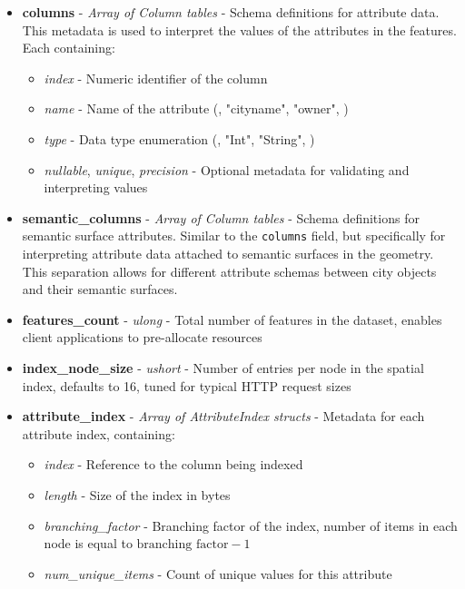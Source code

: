 \begin{itemize}
  \item \textbf{columns} - \textit{Array of Column tables} - Schema definitions for attribute data. This metadata is used to interpret the values of the attributes in the features. Each containing:
    \begin{itemize}
      \item \textit{index} - Numeric identifier of the column
      \item \textit{name} - Name of the attribute (\eg, "cityname", "owner", \etc)
      \item \textit{type} - Data type enumeration (\eg, "Int", "String", \etc)
      \item \textit{nullable}, \textit{unique}, \textit{precision} - Optional metadata for validating and interpreting values
    \end{itemize}

  \item \textbf{semantic\_columns} - \textit{Array of Column tables} - Schema definitions for semantic surface attributes. Similar to the \texttt{columns} field, but specifically for interpreting attribute data attached to semantic surfaces in the geometry. This separation allows for different attribute schemas between city objects and their semantic surfaces.

  \item \textbf{features\_count} - \textit{ulong} - Total number of features in the dataset, enables client applications to pre-allocate resources

  \item \textbf{index\_node\_size} - \textit{ushort} - Number of entries per node in the spatial index, defaults to 16, tuned for typical HTTP request sizes

  \item \textbf{attribute\_index} - \textit{Array of AttributeIndex structs} - Metadata for each attribute index, containing:
    \begin{itemize}
      \item \textit{index} - Reference to the column being indexed
      \item \textit{length} - Size of the index in bytes
      \item \textit{branching\_factor} - Branching factor of the index, number of items in each node is equal to $\text{branching factor} - 1$
      \item \textit{num\_unique\_items} - Count of unique values for this attribute
    \end{itemize}
\end{itemize}

